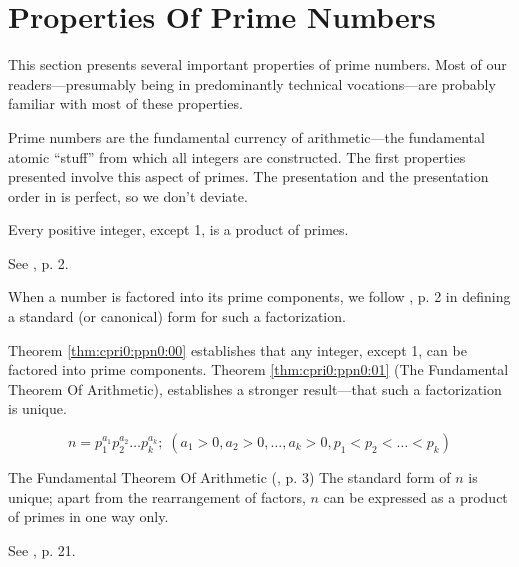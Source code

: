 \section{Properties Of Prime Numbers}
\label{cpri0:ppn0}

This section presents several important properties of prime numbers.  Most
of our readers---presumably being in predominantly technical vocations---are
probably familiar with most of these properties.

Prime numbers are the fundamental currency of arithmetic---the fundamental
atomic ``stuff'' from which all integers are constructed.  The first properties
presented involve this aspect of primes.  The presentation and the
presentation order in
\cite{bibref:b:HardyAndWrightClassic} is perfect, so we don't deviate.

\begin{vworktheoremstatement}
\label{thm:cpri0:ppn0:00}
Every positive integer, except 1, is a product of primes.
\end{vworktheoremstatement}
\begin{vworktheoremproof}
See \cite{bibref:b:HardyAndWrightClassic}, p. 2.
\end{vworktheoremproof}
\vworktheoremfooter{}

When a number is factored into its prime components, we
follow \cite{bibref:b:HardyAndWrightClassic}, p. 2 in defining
a standard (or canonical) form for such a factorization.

Theorem \ref{thm:cpri0:ppn0:00} establishes that any integer, except 1, can be factored
into prime components.  Theorem \ref{thm:cpri0:ppn0:01} (The Fundamental Theorem Of
Arithmetic), establishes a stronger result---that such a factorization
is unique.

\begin{equation}
n = p_1^{a_1} p_2^{a_2} \ldots{} p_k^{a_k}; \;
(a_1 > 0, a_2 > 0, \ldots{} , a_k > 0, p_1 < p_2 < \ldots{} < p_k)
\end{equation}

\begin{vworktheoremstatementpar}{The Fundamental Theorem Of Arithmetic}
\label{thm:cpri0:ppn0:01}
(\cite{bibref:b:HardyAndWrightClassic}, p. 3) The standard form of
$n$ is unique; apart from the rearrangement of factors, $n$ can be
expressed as a product of primes in one way only.
\end{vworktheoremstatementpar}
\begin{vworktheoremproof}
See \cite{bibref:b:HardyAndWrightClassic}, p. 21.
\end{vworktheoremproof}
\vworktheoremfooter{}


